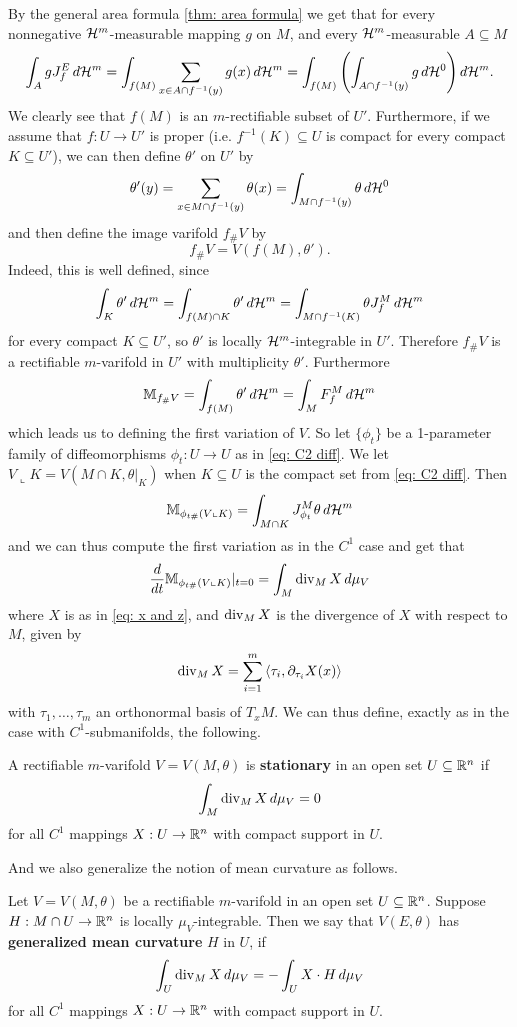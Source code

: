 By the general area formula \cref{thm: area formula} we get that for every nonnegative $\mathcal{H}^m$-measurable mapping $g$ on $M$, and every $\mathcal{H}^m$-measurable $A \subseteq M$
\[
    \int_A gJ_f^E\, d\mathcal{H}^m = \int_{f(M)} \sum_{x \in A \cap f^{-1}(y)} g(x) \, d\mathcal{H}^m = \int_{f(M)} \left( \int_{A \cap f^{-1}(y) } g \, d\mathcal{H}^0 \right) d\mathcal{H}^m.
\]
We clearly see that $f(M)$ is an $m$-rectifiable subset of $U'$. Furthermore, if we assume that $f:U \to U'$ is proper (i.e. $f^{-1}(K) \subseteq U$ is compact for every compact $K \subseteq U'$), we can then define $\theta'$ on $U'$ by
\[
    \theta'(y) = \sum_{x \in M \cap f^{-1}(y)} \theta(x) = \int_{M \cap f^{-1}(y)} \theta \, d\mathcal{H}^0
\]
and then define the image varifold $f_{\#}V$ by
\[
    f_{\#}V = V(f(M),\theta').
\]
Indeed, this is well defined, since
\[
    \int_K \theta' \, d\mathcal{H}^m = \int_{f(M) \cap K} \theta' \, d\mathcal{H}^m = \int_{M \cap f^{-1}(K)} \theta J_f^M\, d\mathcal{H}^m
\]
for every compact $K \subseteq U'$, so $\theta'$ is locally $\mathcal{H}^m$-integrable in $U'$. Therefore $f_{\#}V$ is a rectifiable $m$-varifold in $U'$ with multiplicity $\theta'$. Furthermore
\[
    \mathbb{M}_{f_{\#}V } = \int_{f(M)} \theta'\, d\mathcal{H}^m = \int_M F_f^M\, d\mathcal{H}^m
\]
which leads us to defining the first variation of $V$. So let $\{\phi_t\}$ be a 1-parameter family of diffeomorphisms $\phi_t:U \to U$ as in \eqref{eq: C2 diff}. We let $V \llcorner K = V(M \cap K, \theta|_K)$ when $K \subseteq U$ is the compact set from \eqref{eq: C2 diff}. Then
\[
    \mathbb{M}_{\phi_{t\#}(V \llcorner K) } = \int_{M \cap K} J_{\phi_t}^M \theta\, d \mathcal{H}^m
\]
and we can thus compute the first variation as in the $C^1$ case and get that
\[
    \frac{d}{dt}\mathbb{M}_{\phi_{t\#}(V \llcorner K) }|_{t=0} = \int_M \operatorname{div}_M X \, d\mu_V
\]
where $X$ is as in \eqref{eq: x and z}, and $\operatorname{div}_M X$ is the divergence of $X$ with respect to $M$, given by
\[
    \operatorname{div}_M X = \sum_{i=1}^m \left\langle\tau_i, \partial_{\tau_i} X(x)\right\rangle
\]
with $\tau_1, \dots, \tau_m$ an orthonormal basis of $T_xM$. We can thus define, exactly as in the case with $C^1$-submanifolds, the following.

\begin{definition}
A rectifiable $m$-varifold $V=V(M,\theta)$ is \textbf{stationary} in an open set $U \subseteq \mathbb{R}^n$ if
\[
    \int_M \operatorname{div}_M X \, d\mu_V = 0
\]
for all $C^1$ mappings $X: U \to \mathbb{R}^n$ with compact support in $U$.
\end{definition}
And we also generalize the notion of mean curvature as follows.
\begin{definition}\label{def: generalized mean curvature}
Let $V=V(M, \theta)$ be a rectifiable $m$-varifold in an open set $U \subseteq \mathbb{R}^n$. Suppose $H:M \cap U \to \mathbb{R}^n$ is locally $\mu_V$-integrable. Then we say that $V(E, \theta)$ has \textbf{generalized mean curvature} $H$ in $U$, if
\[
    \int_U \operatorname{div}_M X\, d\mu_V = - \int_U X\cdot H\, d\mu_V
\]
for all $C^1$ mappings $X: U \to \mathbb{R}^n$ with compact support in $U$.
\end{definition}

